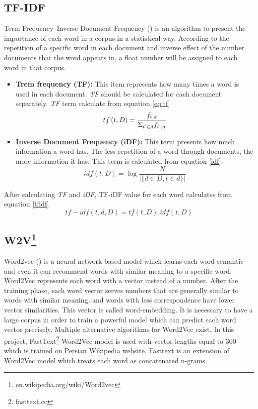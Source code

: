 \subsection{TF-IDF}

Term Frequency–Inverse Document Frequency (\cite{tfidf}) is an algorithm to present the importance of each word in a corpus in a statistical way. According to the repetition of a specific word in each document and inverse effect of the number documents that the word appears in, a float number will be assigned to each word in that corpus.  
\begin{itemize}
	\item \textbf{Trem frequency (TF):} This item represents how many times a word is used in each document. \textit{TF} should be calculated for each document separately. \textit{TF} term calculate from equation \ref{eq:tf}
	\begin{equation}
	\label{eq:tf}
		tf \left(t,D\right) = \frac{f_{t,d}}{\Sigma_{t^{`} \in d } f_{t^{`}, d}}
	\end{equation}
	
	\item \textbf{Inverse Document Frequency (iDF):} This term presents how much information a word has. The less repetition of a word through documents, the more information it has. This term is calculated from equation \ref{idf}. 
	\begin{equation}
	\label{idf}
		idf \left( t,D\right) = \log \frac{N}{\left|\{d\in D, t \in d\}\right| }
	\end{equation}
\end{itemize}

\noindent
After calculating \textit{TF} and \textit{iDF}, TF-iDF value for each word calculates from equation \ref{tfidf}.
\begin{equation}
	\label{tfidf}
	tf-idf\left(t,d,D\right) =  tf \left( t,D\right) . idf \left( t,D\right)
\end{equation}


\subsection{W2V\protect\footnote{en.wikipedia.org/wiki/Word2vec}}
Word2vec (\cite{word2vec}) is a neural network-based model which learns each word semantic and even it can recommend words with similar meaning to a specific word. Word2Vec represents each word with a vector instead of a number. After the training phase, each word vector serves numbers that are generally similar to words with similar meaning, and words with less correspondence have lower vector similarities. This vector is called word-embedding. It is necessary to have a large corpus in order to train a powerful model which can predict each word vector precisely. Multiple alternative algorithms for Word2Vec exist. In this project, FastText\footnote{fasttext.cc} Word2Vec model is used with vector lengths equal to 300 which is trained on Persian Wikipedia website. Fasttext is an extension of Word2Vec model which treats each word as concatenated n-grams.  


